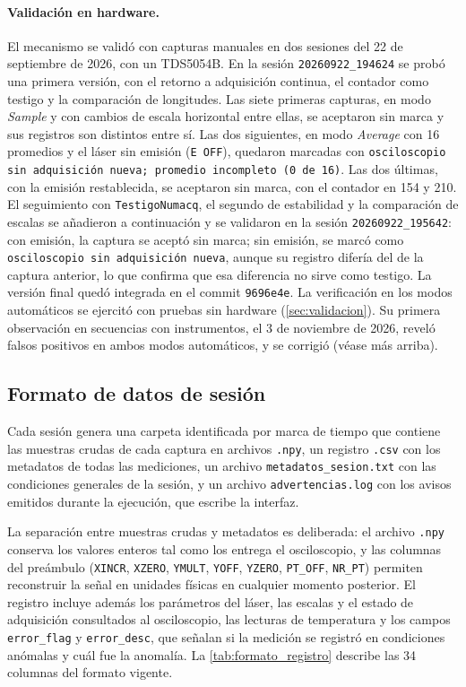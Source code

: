 \paragraph{Validación en hardware.} El mecanismo se validó con capturas
manuales en dos sesiones del 22 de septiembre de 2026, con un TDS5054B.
En la sesión \texttt{20260922\_194624} se probó una primera versión,
con el retorno a adquisición continua, el contador como testigo y la
comparación de longitudes. Las siete primeras capturas, en modo
\textit{Sample} y con cambios de escala horizontal entre ellas, se
aceptaron sin marca y sus registros son distintos entre sí. Las dos
siguientes, en modo \textit{Average} con 16 promedios y el láser sin
emisión (\texttt{E OFF}), quedaron marcadas con
\texttt{osciloscopio sin adquisición nueva; promedio incompleto (0 de
16)}. Las dos últimas, con la emisión restablecida, se aceptaron sin
marca, con el contador en 154 y 210. El seguimiento con
\texttt{TestigoNumacq}, el segundo de estabilidad y la comparación de
escalas se añadieron a continuación y se validaron en la sesión
\texttt{20260922\_195642}: con emisión, la captura se aceptó sin marca;
sin emisión, se marcó como \texttt{osciloscopio sin adquisición nueva},
aunque su registro difería del de la captura anterior, lo que confirma
que esa diferencia no sirve como testigo. La versión final quedó
integrada en el commit \texttt{9696e4e}. La verificación en los modos
automáticos se ejercitó con pruebas sin hardware
(\cref{sec:validacion}). Su primera observación en secuencias con
instrumentos, el 3 de noviembre de 2026, reveló falsos positivos en
ambos modos automáticos, y se corrigió (véase más arriba).

\subsection{Formato de datos de sesión}
\label{sec:formato_datos}

Cada sesión genera una carpeta identificada por marca de tiempo que
contiene las muestras crudas de cada captura en archivos \texttt{.npy},
un registro \texttt{.csv} con los metadatos de todas las mediciones, un
archivo \texttt{metadatos\_sesion.txt} con las condiciones generales de
la sesión, y un archivo \texttt{advertencias.log} con los avisos
emitidos durante la ejecución, que escribe la interfaz.

La separación entre muestras crudas y metadatos es deliberada: el
archivo \texttt{.npy} conserva los valores enteros tal como los entrega
el osciloscopio, y las columnas del preámbulo (\texttt{XINCR},
\texttt{XZERO}, \texttt{YMULT}, \texttt{YOFF}, \texttt{YZERO},
\texttt{PT\_OFF}, \texttt{NR\_PT}) permiten reconstruir la señal en
unidades físicas en cualquier momento posterior. El registro incluye
además los parámetros del láser, las escalas y el estado de
adquisición consultados al osciloscopio, las lecturas de temperatura y
los campos \texttt{error\_flag} y \texttt{error\_desc}, que señalan si
la medición se registró en condiciones anómalas y cuál fue la
anomalía. La \cref{tab:formato_registro} describe las 34 columnas del
formato vigente.

